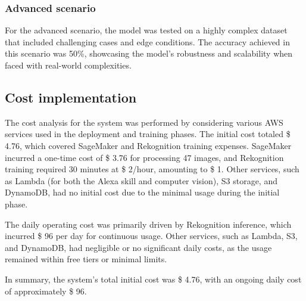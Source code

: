 \subsubsection{Advanced scenario}

For the advanced scenario, the model was tested on a highly complex dataset that included challenging cases and edge conditions. The accuracy achieved in this scenario was 50\%, showcasing the model's robustness and scalability when faced with real-world complexities.

\subsection{Cost implementation}

The cost analysis for the system was performed by considering various AWS services used in the deployment and training phases. The initial cost totaled \$ 4.76, which covered SageMaker and Rekognition training expenses. SageMaker incurred a one-time cost of \$ 3.76 for processing 47 images, and Rekognition training required 30 minutes at \$ 2/hour, amounting to \$ 1. Other services, such as Lambda (for both the Alexa skill and computer vision), S3 storage, and DynamoDB, had no initial cost due to the minimal usage during the initial phase.

The daily operating cost was primarily driven by Rekognition inference, which incurred \$ 96 per day for continuous usage. Other services, such as Lambda, S3, and DynamoDB, had negligible or no significant daily costs, as the usage remained within free tiers or minimal limits.

In summary, the system’s total initial cost was \$ 4.76, with an ongoing daily cost of approximately \$ 96.

